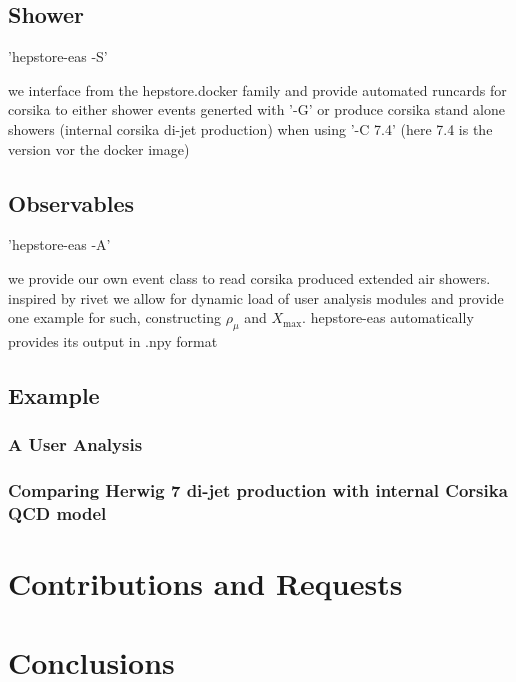 \documentclass[aps,prd,11pt,tightenlines,superscriptaddress,nofootinbib,preprintnumbers,notitlepage]{revtex4-1}
\begin{document}
\subsection{Shower}

'hepstore-eas -S'

we interface from the hepstore.docker family and provide automated runcards for corsika to either shower events generted with '-G' or produce corsika stand alone showers (internal corsika di-jet production) when using '-C 7.4' (here 7.4 is the version vor the docker image)

\subsection{Observables}

'hepstore-eas -A'

we provide our own event class to read corsika produced extended air showers. inspired by rivet we allow for dynamic load of user analysis modules and provide one example for such, constructing $\rho_\mu$ and $X_\text{max}$. hepstore-eas automatically provides its output in .npy format

\subsection{Example}

\subsubsection{A User Analysis}

\subsubsection{Comparing Herwig 7 di-jet production with internal Corsika QCD model}

\section{Contributions and Requests}

\section{Conclusions}
\end{document}
